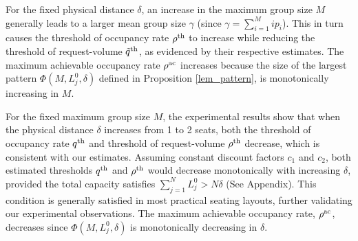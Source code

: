 For the fixed physical distance $\delta$, an increase in the maximum group size $M$ generally leads to a larger mean group size $\gamma$ (since $\gamma = \sum_{i=1}^{M} i p_i$). This in turn causes the threshold of occupancy rate $\rho^{\textup{th}}$ to increase while reducing the threshold of request-volume $\tilde{q}^{\textup{th}}$, as evidenced by their respective estimates. The maximum achievable occupancy rate $\rho^{\textup{ac}}$ increases because the size of the largest pattern $\Phi(M, L_j^{0}, \delta)$ defined in Proposition \ref{lem_pattern}, is monotonically increasing in $M$.

For the fixed maximum group size $M$, the experimental results show that when the physical distance $\delta$ increases from 1 to 2 seats, both the threshold of occupancy rate $q^{\textup{th}}$ and threshold of request-volume $\rho^{\textup{th}}$ decrease, which is consistent with our estimates.
Assuming constant discount factors $c_1$ and $c_2$, both estimated thresholds $q^{\textup{th}}$ and  $\rho^{\textup{th}}$ would decrease monotonically with increasing $\delta$, provided the total capacity satisfies $\sum_{j=1}^{N} L_{j}^{0} > N \delta$ (See Appendix). This condition is generally satisfied in most practical seating layouts, further validating our experimental observations. The maximum achievable occupancy rate, $\rho^{\textup{ac}}$, decreases since $\Phi(M, L_j^{0}, \delta)$ is monotonically decreasing in $\delta$.
 





